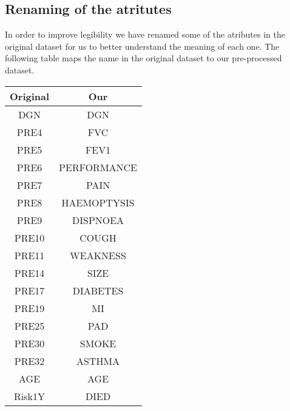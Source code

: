 \subsection{Renaming of the atritutes}

In order to improve legibility we have renamed some of the atributes in the original dataset for us to better understand the meaning of each one. The following table maps the name in the original dataset to our pre-processed dataset.

\begin{center}

\begin{tabular}{|c|c|}
    \hline
    \textbf{Original} & \textbf{Our} \\ \hline\hline
    DGN & DGN \\ \hline
    PRE4 & FVC \\ \hline
    PRE5 & FEV1 \\ \hline
    PRE6 & PERFORMANCE \\ \hline
    PRE7 & PAIN \\ \hline
    PRE8 & HAEMOPTYSIS \\ \hline
    PRE9 & DISPNOEA \\ \hline
    PRE10 & COUGH \\ \hline
    PRE11 & WEAKNESS \\ \hline
    PRE14 & SIZE \\ \hline
    PRE17 & DIABETES \\ \hline
    PRE19 & MI \\ \hline
    PRE25 & PAD \\ \hline
    PRE30 & SMOKE \\ \hline
    PRE32 & ASTHMA \\ \hline
    AGE & AGE \\ \hline
    Risk1Y & DIED \\ \hline

\end{tabular}
\end{center}



